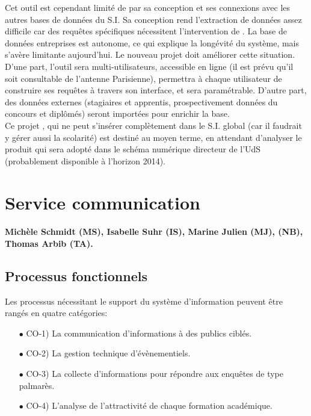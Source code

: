 \documentclass{book}
\begin{document}
Cet outil est cependant limité de par sa conception et ses connexions
avec les autres bases de données du S.I. Sa conception rend l'extraction
de données assez difficile car des requêtes spécifiques nécessitent 
l'intervention de \CK. La base de données entreprises est autonome, ce
qui explique la longévité du système, mais s'avère limitante aujourd'hui.
Le nouveau projet  doit améliorer cette situation. D'une part, l'outil
sera multi-utilisateurs, accessible en ligne (il est prévu qu'il soit 
consultable de l'antenne Parisienne), permettra à chaque utilisateur de 
construire ses requêtes à travers son interface, et sera paramétrable. 
D'autre part, des données externes (stagiaires et apprentis, prospectivement 
données du concours et diplômés) seront importées pour enrichir la base.\\

Ce projet , qui ne peut s'insérer complètement dans le S.I. global
(car il faudrait y gérer aussi la scolarité) est destiné au moyen terme,
en attendant d'analyser le produit  qui sera adopté dans le schéma
numérique directeur de l'UdS (probablement disponible à l'horizon 2014). 

  

\section{Service communication}

\paragraph{Michèle Schmidt (MS), Isabelle Suhr (IS), Marine Julien (MJ), 
\NB (NB), Thomas Arbib (TA).}

\subsection{Processus fonctionnels}
Les processus nécessitant le support du système d'information peuvent 
être rangés en quatre catégories:
\begin{itemize}
\item[$\bullet$] CO-1) La communication d'informations à des publics ciblés.
\item[$\bullet$] CO-2) La gestion technique d'évènementiels.
\item[$\bullet$] CO-3) La collecte d'informations pour répondre aux enquêtes de type 
      palmarès.
\item[$\bullet$] CO-4) L'analyse de l'attractivité de chaque formation académique.
\end{itemize}
\bigskip
\end{document}
